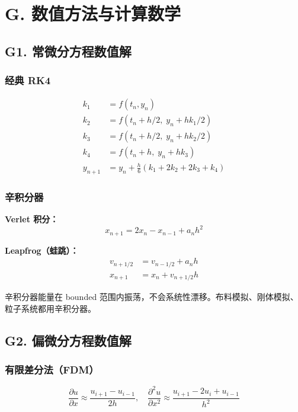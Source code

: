 \section{G. 数值方法与计算数学}

\subsection{G1. 常微分方程数值解}

\subsubsection{经典 RK4}

\begin{align*}
k_1 &= f(t_n, y_n) \\
k_2 &= f(t_n + h/2,\; y_n + hk_1/2) \\
k_3 &= f(t_n + h/2,\; y_n + hk_2/2) \\
k_4 &= f(t_n + h,\; y_n + hk_3) \\
y_{n+1} &= y_n + \frac{h}{6}(k_1 + 2k_2 + 2k_3 + k_4)
\end{align*}

\subsubsection{辛积分器}

\textbf{Verlet 积分：}
\[
x_{n+1} = 2x_n - x_{n-1} + a_n h^2
\]

\textbf{Leapfrog（蛙跳）：}
\begin{align*}
v_{n+1/2} &= v_{n-1/2} + a_n h \\
x_{n+1} &= x_n + v_{n+1/2} h
\end{align*}

辛积分器能量在 bounded 范围内振荡，不会系统性漂移。布料模拟、刚体模拟、粒子系统都用辛积分器。

\subsection{G2. 偏微分方程数值解}

\subsubsection{有限差分法（FDM）}

\[
\frac{\partial u}{\partial x} \approx \frac{u_{i+1} - u_{i-1}}{2h}, \quad
\frac{\partial^2 u}{\partial x^2} \approx \frac{u_{i+1} - 2u_i + u_{i-1}}{h^2}
\]

